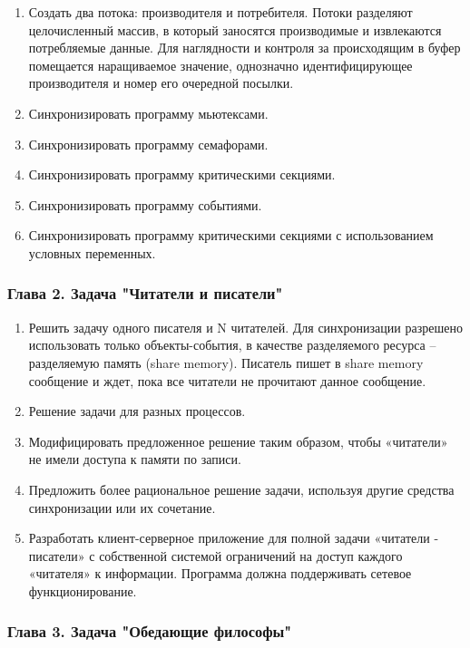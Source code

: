 \documentclass[14pt,a4paper,report]{report}
\begin{document}
\begin{enumerate}
	\item Создать два потока: производителя и потребителя. Потоки разделяют целочисленный массив, в который заносятся производимые и извлекаются потребляемые данные. Для наглядности и контроля за происходящим в буфер помещается наращиваемое значение, однозначно идентифицирующее производителя и номер его очередной посылки.
	\item Синхронизировать программу мьютексами.
	\item Синхронизировать программу семафорами.
	\item Синхронизировать программу критическими секциями.
	\item Синхронизировать программу событиями.
	\item Синхронизировать программу критическими секциями с использованием условных переменных.
\end{enumerate}


\subsubsection{Глава 2. Задача "Читатели и писатели"}

\begin{enumerate}
	\item Решить задачу одного писателя и N читателей. Для синхронизации разрешено использовать только объекты-события, в качестве разделяемого ресурса – разделяемую память (share memory). Писатель пишет в share memory сообщение и ждет, пока все читатели не прочитают данное сообщение.
	\item Решение задачи для разных процессов.
	\item Модифицировать предложенное решение таким образом, чтобы «читатели» не имели доступа к памяти по записи.
	\item Предложить более рациональное решение задачи, используя другие средства синхронизации или их сочетание.
	\item Разработать клиент-серверное приложение для полной задачи «читатели - писатели» с собственной системой ограничений на доступ каждого «читателя» к информации. Программа должна поддерживать сетевое функционирование. 
\end{enumerate}

\subsubsection{Глава 3. Задача "Обедающие философы"}
\end{document}
